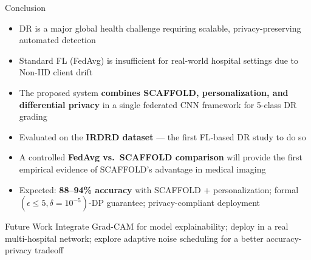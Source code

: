 \documentclass[aspectratio=169, 11pt]{beamer}
\begin{document}
\begin{frame}{Conclusion}
  \begin{itemize}\small
    \item DR is a major global health challenge requiring scalable, privacy-preserving automated detection
    \item Standard FL (FedAvg) is insufficient for real-world hospital settings due to Non-IID client drift
    \item The proposed system \textbf{combines SCAFFOLD, personalization, and differential privacy} in a single federated CNN framework for 5-class DR grading
    \item Evaluated on the \textbf{IRDRD dataset} --- the first FL-based DR study to do so
    \item A controlled \textbf{FedAvg vs.\ SCAFFOLD comparison} will provide the first empirical evidence of SCAFFOLD's advantage in medical imaging
    \item Expected: \textbf{88--94\% accuracy} with SCAFFOLD + personalization; formal $(\epsilon \leq 5, \delta=10^{-5})$-DP guarantee; privacy-compliant deployment
  \end{itemize}
  \vspace{4pt}
  \begin{block}{Future Work}\small
    Integrate Grad-CAM for model explainability; deploy in a real multi-hospital network; explore adaptive noise scheduling for a better accuracy-privacy tradeoff
  \end{block}
\end{frame}
\end{document}
